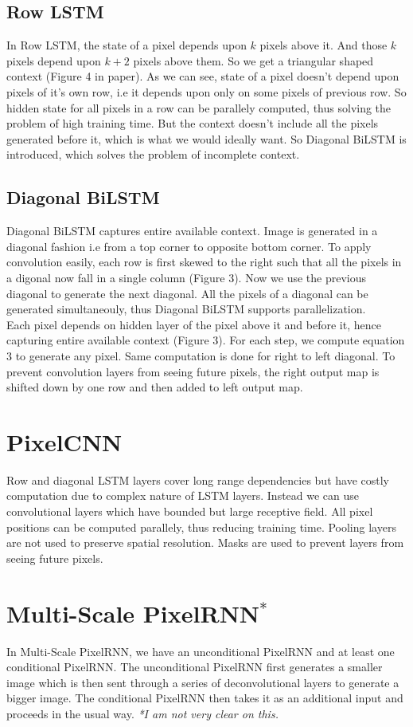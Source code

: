\documentclass{article}
\begin{document}
    \subsection*{Row LSTM}
        In Row LSTM, the state of a pixel depends upon $k$ pixels above it. And those $k$ pixels depend upon $k+2$ pixels above them. So we get a triangular shaped context (Figure 4 in paper). As we can see, state of a pixel doesn't depend upon pixels of it's own row, i.e it depends upon only on some pixels of previous row. So hidden state for all pixels in a row can be parallely computed, thus solving the problem of high training time. But the context doesn't include all the pixels generated before it, which is what we would ideally want. So Diagonal BiLSTM is introduced, which solves the problem of incomplete context.

    \subsection*{Diagonal BiLSTM}
      Diagonal BiLSTM captures entire available context. Image is generated in a diagonal fashion i.e from a top corner to opposite bottom corner.
      To apply convolution easily, each row is first skewed to the right such that all the pixels in a digonal now fall in a single column (Figure 3).
      Now we use the previous diagonal to generate the next diagonal. All the pixels of a diagonal can be generated simultaneouly, thus Diagonal BiLSTM supports parallelization.\\
      Each pixel depends on hidden layer of the pixel above it and before it, hence capturing entire available context (Figure 3). For each step, we compute equation 3 to generate any pixel.
      Same computation is done for right to left diagonal. To prevent convolution layers from seeing future pixels, the right output map is shifted down by one row and then added to left output map.

\section*{PixelCNN}
Row and diagonal LSTM layers cover long range dependencies but have costly computation due to complex nature of LSTM layers. Instead we can use convolutional layers which have bounded but large receptive field.
All pixel positions can be computed parallely, thus reducing training time. Pooling layers are not used to preserve spatial resolution. Masks are used to prevent layers from seeing future pixels.

\section*{Multi-Scale PixelRNN$^*$}
In Multi-Scale PixelRNN, we have an unconditional PixelRNN and at least one conditional PixelRNN. The unconditional PixelRNN first generates a smaller image which is then sent through a series of deconvolutional layers to generate a bigger image. The conditional PixelRNN then takes it as an additional input and proceeds in the usual way. \hfill \small{\textit{*I am not very clear on this.}}\\
\end{document}
